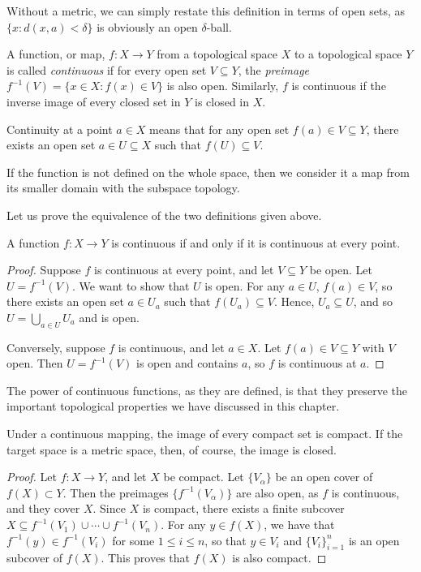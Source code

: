 Without a metric, we can simply restate this definition in terms of open sets, as $\{x \colon d(x,a)<\delta\}$ is obviously an open $\delta$-ball.

\begin{definition}
	A function, or map, $f \colon X \rightarrow Y$ from a topological space $X$ to a topological space $Y$ is called \emph{continuous} if for every open set $V \subseteq Y$, the \emph{preimage} $f^{-1}(V)=\{x \in X \colon f(x) \in V\}$ is also open. Similarly, $f$ is continuous if the inverse image of every closed set in $Y$ is closed in $X$.
	
	Continuity at a point $a \in X$ means that for any open set $f(a) \in V \subseteq Y$, there exists an open set $a \in U \subseteq X$ such that $f(U) \subseteq V$.
\end{definition}

If the function is not defined on the whole space, then we consider it a map from its smaller domain with the subspace topology.

Let us prove the equivalence of the two definitions given above.

\begin{proposition}
	A function $f \colon X \rightarrow Y$ is continuous if and only if it is continuous at every point.
\end{proposition}
\begin{proof}
	Suppose $f$ is continuous at every point, and let $V \subseteq Y$ be open. Let $U=f^{-1}(V)$. We want to show that $U$ is open. For any $a \in U$, $f(a) \in V$, so there exists an open set $a \in U_a$ such that $f(U_a) \subseteq V$. Hence, $U_a \subseteq U$, and so $U=\bigcup_{a \in U}U_a$ and is open.
	
	Conversely, suppose $f$ is continuous, and let $a \in X$. Let $f(a) \in V \subseteq Y$ with $V$ open. Then $U=f^{-1}(V)$ is open and contains $a$, so $f$ is continuous at $a$.
\end{proof}

The power of continuous functions, as they are defined, is that they preserve the important topological properties we have discussed in this chapter.

\begin{theorem}
	Under a continuous mapping, the image of every compact set is compact. If the target space is a metric space, then, of course, the image is closed.
\end{theorem}

\begin{proof}
	Let $f \colon X \rightarrow Y$, and let $X$ be compact. Let $\{V_{\alpha}\}$ be an open cover of $f(X) \subset Y$. Then the preimages $\{f^{-1}(V_{\alpha})\}$ are also open, as $f$ is continuous, and they cover $X$. Since $X$ is compact, there exists a finite subcover $X \subseteq f^{-1}(V_1) \cup \cdots \cup f^{-1}(V_n)$. For any $y \in f(X)$, we have that $f^{-1}(y) \in f^{-1}(V_i)$ for some $1 \le i \le n$, so that $y \in V_i$ and $\{V_i\}_{i=1}^{n}$ is an open subcover of $f(X)$. This proves that $f(X)$ is also compact.
\end{proof}

